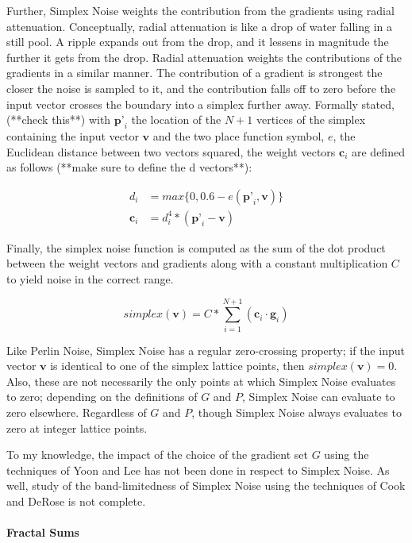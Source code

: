 \documentclass[12pt]{article}
\theoremstyle{definition}
\theoremstyle{remark}
\begin{document}
Further, Simplex Noise weights the contribution from the gradients using radial attenuation. Conceptually, radial attenuation is like a drop of water falling in a still pool. A ripple expands out from the drop, and it lessens in magnitude the further it gets from the drop. Radial attenuation weights the contributions of the gradients in a similar manner. The contribution of a gradient is strongest the closer the noise is sampled to it, and the contribution falls off to zero before the input vector crosses the boundary into a simplex further away. Formally stated, (**check this**) with $\textbf{p'}_i$ the location of the $N+1$ vertices of the simplex containing the input vector $\textbf{v}$ and the two place function symbol, $e$, the Euclidean distance between two vectors squared, the weight vectors $\textbf{c}_i$ are defined as follows (**make sure to define the d vectors**):

\begin{align*}
d_i &= max\{0, 0.6-e(\textbf{p'}_i,\textbf{v})\} \\
\textbf{c}_i &= d_i^4 * (\textbf{p'}_i - \textbf{v})
\end{align*}

Finally, the simplex noise function is computed as the sum of the dot product between the weight vectors and gradients along with a constant multiplication $C$ to yield noise in the correct range. 

\begin{equation*}
	simplex(\textbf{v}) = C * \sum_{i=1}^{N+1}(\textbf{c}_i \cdot \textbf{g}_i)
\end{equation*}

Like Perlin Noise, Simplex Noise has a regular zero-crossing property; if the input vector $\textbf{v}$ is identical to one of the simplex lattice points, then $simplex(\textbf{v})=0$. Also, these are not necessarily the only points at which Simplex Noise evaluates to zero; depending on the definitions of $G$ and $P$, Simplex Noise can evaluate to zero elsewhere. Regardless of $G$ and $P$, though Simplex Noise always evaluates to zero at integer lattice points.

To my knowledge, the impact of the choice of the gradient set $G$ using the techniques of Yoon and Lee has not been done in respect to Simplex Noise. As well, study of the band-limitedness of Simplex Noise using the techniques of Cook and DeRose is not complete.

\paragraph{Fractal Sums}
\end{document}
